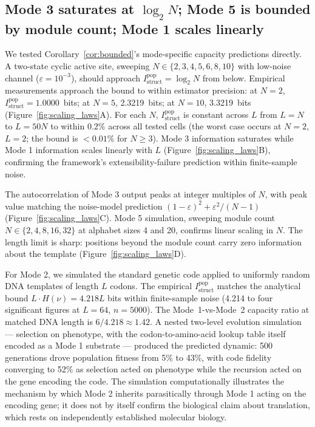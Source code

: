 \documentclass[aps,prx,reprint,amsmath,amssymb,floatfix,superscriptaddress,nofootinbib]{revtex4-2}
\theoremstyle{plain-thm}
\theoremstyle{definition-thm}
\newcommand{\Istructpop}{I_{\mathrm{struct}}^{\mathrm{pop}}}
\begin{document}
\subsection{Mode 3 saturates at $\log_2 N$; Mode 5 is bounded by module count; Mode 1 scales linearly}

We tested Corollary~\ref{cor:bounded}'s mode-specific capacity predictions directly. A two-state cyclic active site, sweeping $N \in \{2, 3, 4, 5, 6, 8, 10\}$ with low-noise channel ($\varepsilon = 10^{-3}$), should approach $\Istructpop = \log_2 N$ from below. Empirical measurements approach the bound to within estimator precision: at $N = 2$, $\Istructpop = 1.0000$~bits; at $N = 5$, 2.3219~bits; at $N = 10$, 3.3219~bits (Figure~\ref{fig:scaling_laws}A). For each $N$, $\Istructpop$ is constant across $L$ from $L = N$ to $L = 50N$ to within $0.2\%$ across all tested cells (the worst case occurs at $N = 2$, $L = 2$; the bound is $< 0.01\%$ for $N \ge 3$). Mode 3 information saturates while Mode 1 information scales linearly with $L$ (Figure~\ref{fig:scaling_laws}B), confirming the framework's extensibility-failure prediction within finite-sample noise.

The autocorrelation of Mode 3 output peaks at integer multiples of $N$, with peak value matching the noise-model prediction $(1 - \varepsilon)^2 + \varepsilon^2/(N - 1)$ (Figure~\ref{fig:scaling_laws}C). Mode 5 simulation, sweeping module count $N \in \{2, 4, 8, 16, 32\}$ at alphabet sizes 4 and 20, confirms linear scaling in $N$. The length limit is sharp: positions beyond the module count carry zero information about the template (Figure~\ref{fig:scaling_laws}D).

For Mode 2, we simulated the standard genetic code applied to uniformly random DNA templates of length $L$ codons. The empirical $\Istructpop$ matches the analytical bound $L \cdot H(\nu) = 4.218L$ bits within finite-sample noise (4.214 to four significant figures at $L = 64$, $n = 5000$). The Mode~1-vs-Mode~2 capacity ratio at matched DNA length is $6/4.218 \approx 1.42$. A nested two-level evolution simulation --- selection on phenotype, with the codon-to-amino-acid lookup table itself encoded as a Mode 1 substrate --- produced the predicted dynamic: 500 generations drove population fitness from 5\% to 43\%, with code fidelity converging to 52\% as selection acted on phenotype while the recursion acted on the gene encoding the code. The simulation computationally illustrates the mechanism by which Mode 2 inherits parasitically through Mode 1 acting on the encoding gene; it does not by itself confirm the biological claim about translation, which rests on independently established molecular biology.
\end{document}
